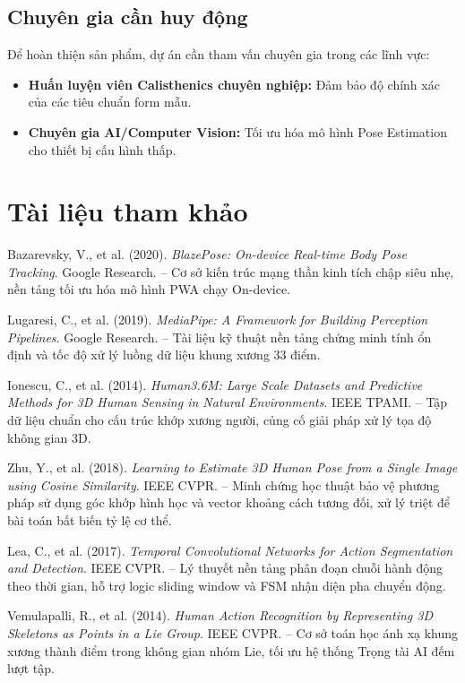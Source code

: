 \documentclass[a4paper,12pt]{article}
\begin{document}
\subsection{Chuyên gia cần huy động}
Để hoàn thiện sản phẩm, dự án cần tham vấn chuyên gia trong các lĩnh vực:
\begin{itemize}
    \item \textbf{Huấn luyện viên Calisthenics chuyên nghiệp:} Đảm bảo độ chính xác của các tiêu chuẩn form mẫu.
    \item \textbf{Chuyên gia AI/Computer Vision:} Tối ưu hóa mô hình Pose Estimation cho thiết bị cấu hình thấp.
\end{itemize}

\section{Tài liệu tham khảo}

\begin{enumerate}[label={[\arabic*]}]
    \item Bazarevsky, V., et al. (2020). \textit{BlazePose: On-device Real-time Body Pose Tracking}. Google Research. -- Cơ sở kiến trúc mạng thần kinh tích chập siêu nhẹ, nền tảng tối ưu hóa mô hình PWA chạy On-device.

    \item Lugaresi, C., et al. (2019). \textit{MediaPipe: A Framework for Building Perception Pipelines}. Google Research. -- Tài liệu kỹ thuật nền tảng chứng minh tính ổn định và tốc độ xử lý luồng dữ liệu khung xương 33 điểm.

    \item Ionescu, C., et al. (2014). \textit{Human3.6M: Large Scale Datasets and Predictive Methods for 3D Human Sensing in Natural Environments}. IEEE TPAMI. -- Tập dữ liệu chuẩn cho cấu trúc khớp xương người, củng cố giải pháp xử lý tọa độ không gian 3D.

    \item Zhu, Y., et al. (2018). \textit{Learning to Estimate 3D Human Pose from a Single Image using Cosine Similarity}. IEEE CVPR. -- Minh chứng học thuật bảo vệ phương pháp sử dụng góc khớp hình học và vector khoảng cách tương đối, xử lý triệt để bài toán bất biến tỷ lệ cơ thể.

    \item Lea, C., et al. (2017). \textit{Temporal Convolutional Networks for Action Segmentation and Detection}. IEEE CVPR. -- Lý thuyết nền tảng phân đoạn chuỗi hành động theo thời gian, hỗ trợ logic sliding window và FSM nhận diện pha chuyển động.

    \item Vemulapalli, R., et al. (2014). \textit{Human Action Recognition by Representing 3D Skeletons as Points in a Lie Group}. IEEE CVPR. -- Cơ sở toán học ánh xạ khung xương thành điểm trong không gian nhóm Lie, tối ưu hệ thống Trọng tài AI đếm lượt tập.
\end{enumerate}
\end{document}
